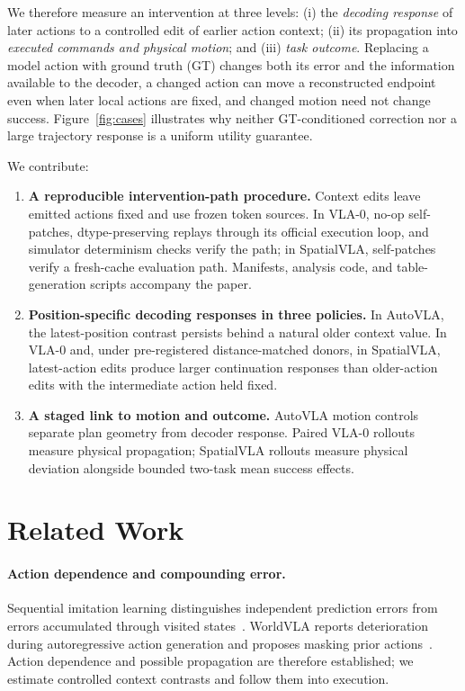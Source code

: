 We therefore measure an intervention at three levels: (i) the \emph{decoding response} of later actions to a controlled edit of earlier action context; (ii) its propagation into \emph{executed commands and physical motion}; and (iii) \emph{task outcome}. Replacing a model action with ground truth (GT) changes both its error and the information available to the decoder, a changed action can move a reconstructed endpoint even when later local actions are fixed, and changed motion need not change success. Figure~\ref{fig:cases} illustrates why neither GT-conditioned correction nor a large trajectory response is a uniform utility guarantee.

We contribute:
\begin{enumerate}[leftmargin=*,itemsep=1pt,topsep=2pt]
\item \textbf{A reproducible intervention-path procedure.} Context edits leave emitted actions fixed and use frozen token sources. In VLA-0, no-op self-patches, dtype-preserving replays through its official execution loop, and simulator determinism checks verify the path; in SpatialVLA, self-patches verify a fresh-cache evaluation path. Manifests, analysis code, and table-generation scripts accompany the paper.
\item \textbf{Position-specific decoding responses in three policies.} In AutoVLA, the latest-position contrast persists behind a natural older context value. In VLA-0 and, under pre-registered distance-matched donors, in SpatialVLA, latest-action edits produce larger continuation responses than older-action edits with the intermediate action held fixed.
\item \textbf{A staged link to motion and outcome.} AutoVLA motion controls separate plan geometry from decoder response. Paired VLA-0 rollouts measure physical propagation; SpatialVLA rollouts measure physical deviation alongside bounded two-task mean success effects.
\end{enumerate}

\section{Related Work}
\paragraph{Action dependence and compounding error.}
Sequential imitation learning distinguishes independent prediction errors from errors accumulated through visited states~\cite{ross2011dagger}. WorldVLA reports deterioration during autoregressive action generation and proposes masking prior actions~\cite{cen2025worldvla}. Action dependence and possible propagation are therefore established; we estimate controlled context contrasts and follow them into execution.

